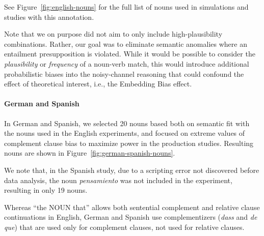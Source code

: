 See Figure~\ref{fig:english-nouns} for the full list of nouns used in simulations and studies with this annotation.


Note that we on purpose did not aim to only include high-plausibility combinations.
Rather, our goal was to eliminate semantic anomalies where an entailment presupposition is violated. 
While it would be possible to consider the \emph{plausibility} or \emph{frequency} of a noun-verb match, this would introduce additional probabilistic biases into the noisy-channel reasoning that could confound the effect of theoretical interest, i.e., the Embedding Bias effect.


\paragraph{German and Spanish}
In German and Spanish, we selected 20 nouns based both on semantic fit with the nouns used in the English experiments, and focused on extreme values of complement clause bias to maximize power in the production studies.
Resulting nouns are shown in Figure~\ref{fig:german-spanish-nouns}.

We note that, in the Spanish study, due to a scripting error not discovered before data analysis, the noun \textit{pensamiento} was not included in the experiment, resulting in only 19 nouns.


Whereas ``the NOUN that'' allows both sentential complement and relative clause continuations in English, German and Spanish use complementizers (\textit{dass} and \textit{de que}) that are used only for complement clauses, not used for relative clauses.

